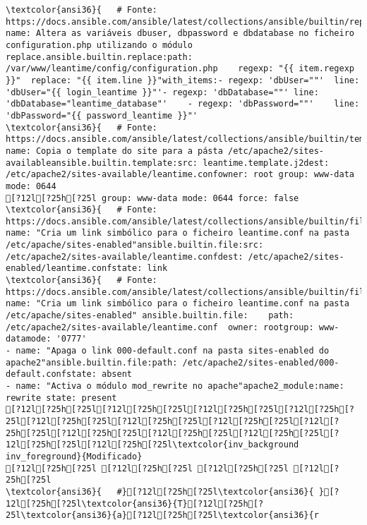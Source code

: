 \documentclass{scrartcl}
\begin{document}
\begin{Verbatim}
\textcolor{ansi36}{   # Fonte: https://docs.ansible.com/ansible/latest/collections/ansible/builtin/replace_module.html}- name: Altera as variáveis dbuser, dbpassword e dbdatabase no ficheiro configuration.php utilizando o módulo replace.ansible.builtin.replace:path: /var/www/leantime/config/configuration.php    regexp: "{{ item.regexp  }}"  replace: "{{ item.line }}"with_items:- regexp: 'dbUser=""'  line: 'dbUser="{{ login_leantime }}"'- regexp: 'dbDatabase=""' line: 'dbDatabase="leantime_database"'    - regexp: 'dbPassword=""'    line: 'dbPassword="{{ password_leantime }}"'
\textcolor{ansi36}{   # Fonte: https://docs.ansible.com/ansible/latest/collections/ansible/builtin/template_module.html}- name: Copia o template do site para a pásta /etc/apache2/sites-availableansible.builtin.template:src: leantime.template.j2dest: /etc/apache2/sites-available/leantime.confowner: root group: www-data mode: 0644
[?12l[?25h[?25l group: www-data mode: 0644 force: false
\textcolor{ansi36}{   # Fonte: https://docs.ansible.com/ansible/latest/collections/ansible/builtin/file_module.html}- name: "Cria um link simbólico para o ficheiro leantime.conf na pasta /etc/apache/sites-enabled"ansible.builtin.file:src: /etc/apache2/sites-available/leantime.confdest: /etc/apache2/sites-enabled/leantime.confstate: link
\textcolor{ansi36}{   # Fonte: https://docs.ansible.com/ansible/latest/collections/ansible/builtin/file_module.html}- name: "Cria um link simbólico para o ficheiro leantime.conf na pasta /etc/apache/sites-enabled" ansible.builtin.file:    path: /etc/apache2/sites-available/leantime.conf  owner: rootgroup: www-datamode: '0777'
- name: "Apaga o link 000-default.conf na pasta sites-enabled do apache2"ansible.builtin.file:path: /etc/apache2/sites-enabled/000-default.confstate: absent
- name: "Activa o módulo mod_rewrite no apache"apache2_module:name: rewrite state: present
[?12l[?25h[?25l[?12l[?25h[?25l[?12l[?25h[?25l[?12l[?25h[?25l[?12l[?25h[?25l[?12l[?25h[?25l[?12l[?25h[?25l[?12l[?25h[?25l[?12l[?25h[?25l[?12l[?25h[?25l[?12l[?25h[?25l[?12l[?25h[?25l[?12l[?25h[?25l\textcolor{inv_background inv_foreground}{Modificado}
[?12l[?25h[?25l [?12l[?25h[?25l [?12l[?25h[?25l [?12l[?25h[?25l
\textcolor{ansi36}{   #}[?12l[?25h[?25l\textcolor{ansi36}{ }[?12l[?25h[?25l\textcolor{ansi36}{T}[?12l[?25h[?25l\textcolor{ansi36}{a}[?12l[?25h[?25l\textcolor{ansi36}{r

\end{Verbatim}
\end{document}
